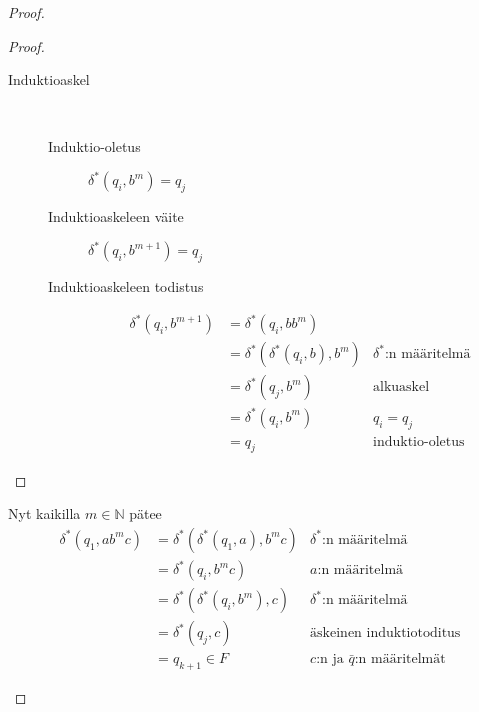 \documentclass[a4paper,11pt,draft]{article}
\begin{document}
\begin{enumerate}
\begin{enumerate}
\begin{proof}
\begin{description}
\begin{proof}
\begin{description}
            \item[Induktioaskel]\hfill\\
              \begin{description}
                \item[Induktio-oletus] $\delta^*(q_i, b^m) = q_j$
                \item[Induktioaskeleen väite] $\delta^*(q_i, b^{m+1}) = q_j$
                \item[Induktioaskeleen todistus]
                  \begin{align*}
                    \delta^*(q_i, b^{m+1}) & = \delta^*(q_i, bb^m) \\
                                           & = \delta^*(\delta^*(q_i,b),b^m)
                                           & \delta^* \textrm{:n määritelmä} \\
                                           & = \delta^*(q_j,b^m)
                                           & \textrm{alkuaskel} \\
                                           & = \delta^*(q_i,b^m)
                                           & q_i = q_j \\
                                           & = q_j
                                           & \textrm{induktio-oletus}
                  \end{align*}

              \end{description}
          \end{description}
          \end{proof}

          Nyt kaikilla $m \in \mathbb{N}$ pätee
          \begin{align*}
            \delta^*(q_1, ab^mc) & = \delta^*(\delta^*(q_1,a),b^mc)
                                 & \delta^* \textrm{:n määritelmä} \\
                                 & = \delta^*(q_i,b^mc)
                                 & a \textrm{:n määritelmä}\\
                                 & = \delta^*(\delta^*(q_i,b^m),c)
                                 & \delta^* \textrm{:n määritelmä} \\
                                 & = \delta^*(q_j,c)
                                 & \textrm{äskeinen induktiotoditus}\\
                                 & = q_{k+1} \in F
                                 & c \textrm{:n ja }
                                   \bar{q} \textrm{:n määritelmät}
          \end{align*}


\end{description}
\end{proof}
\end{enumerate}
\end{enumerate}
\end{document}
